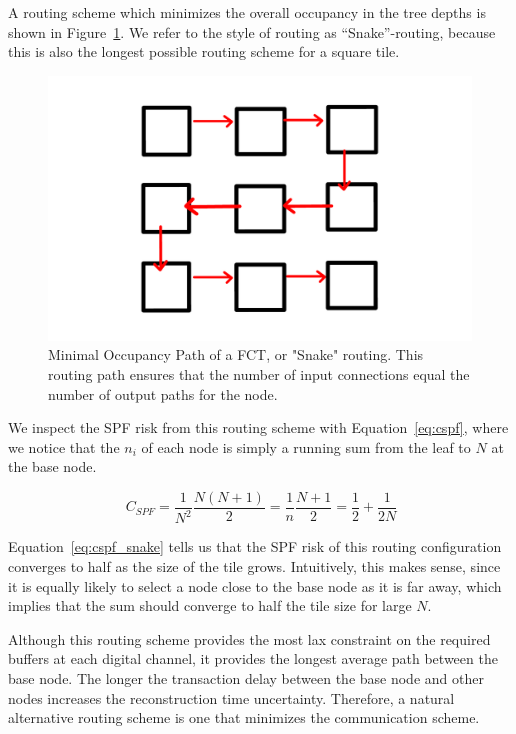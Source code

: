A routing scheme which minimizes the overall occupancy in the tree depths is shown in Figure~\ref{fig:snake}.
We refer to the style of routing as ``Snake''-routing, because this is also the longest possible routing scheme for a square tile.

\begin{figure}[]
\centering
\includegraphics[width=\textwidth]{images/snakeroute.pdf}
\caption{Minimal Occupancy Path of a FCT, or "Snake" routing.
This routing path ensures that the number of input connections equal the number of output paths for the node.}
\label{fig:snake}
\end{figure}

We inspect the SPF risk from this routing scheme with Equation~\ref{eq:cspf}, where we notice that the $n_{i}$ of each node is simply a running sum from the leaf to $N$ at the base node.

\begin{equation}~\label{eq:cspf_snake}
  C_{SPF} = \frac{1}{N^{2}}\frac{N(N+1)}{2} = \frac{1}{n}\frac{N+1}{2} = \frac{1}{2} + \frac{1}{2N}
\end{equation}

Equation~\ref{eq:cspf_snake} tells us that the SPF risk of this routing configuration converges to half as the size of the tile grows.
Intuitively, this makes sense, since it is equally likely to select a node close to the base node as it is far away, which implies that the sum should converge to half the tile size for large $N$.

Although this routing scheme provides the most lax constraint on the required buffers at each digital channel, it provides the longest average path between the base node.
The longer the transaction delay between the base node and other nodes increases the reconstruction time uncertainty.
Therefore, a natural alternative routing scheme is one that minimizes the communication scheme.

